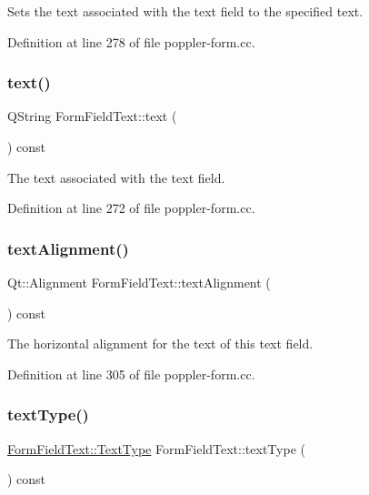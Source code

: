 Sets the text associated with the text field to the specified {\ttfamily text}. 

Definition at line 278 of file poppler-\/form.\+cc.

\mbox{\label{class_poppler_1_1_form_field_text_aa721dbd4add8361464b9699e907ed564}} 
\subsubsection{\texorpdfstring{text()}{text()}}
{\footnotesize\ttfamily Q\+String Form\+Field\+Text\+::text (\begin{DoxyParamCaption}{ }\end{DoxyParamCaption}) const}

The text associated with the text field. 

Definition at line 272 of file poppler-\/form.\+cc.

\mbox{\label{class_poppler_1_1_form_field_text_a3c1765c5816ee5f50ea3048fa9c23f3e}} 
\subsubsection{\texorpdfstring{text\+Alignment()}{textAlignment()}}
{\footnotesize\ttfamily Qt\+::\+Alignment Form\+Field\+Text\+::text\+Alignment (\begin{DoxyParamCaption}{ }\end{DoxyParamCaption}) const}

The horizontal alignment for the text of this text field. 

Definition at line 305 of file poppler-\/form.\+cc.

\mbox{\label{class_poppler_1_1_form_field_text_aafd80a627d6986186b1fd3db3df85c24}} 
\subsubsection{\texorpdfstring{text\+Type()}{textType()}}
{\footnotesize\ttfamily \hyperlink{class_poppler_1_1_form_field_text_a0d67d9badab136dba73e75d3d1d945c2}{Form\+Field\+Text\+::\+Text\+Type} Form\+Field\+Text\+::text\+Type (\begin{DoxyParamCaption}{ }\end{DoxyParamCaption}) const}

